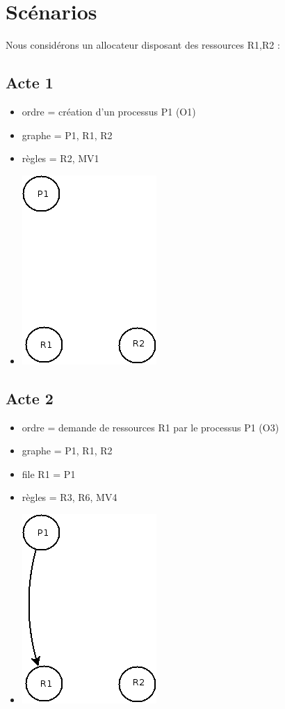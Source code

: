 \documentclass{article}
\newcommand{\bitem}{\item[\textbullet]}
\begin{document}
\newpage
\section{Scénarios}
Nous considérons un allocateur disposant des ressources R1,R2 :\\
\subsection{Acte 1}
\begin{itemize}
  \bitem ordre = création d'un processus P1 (O1)
  \bitem graphe = P1, R1, R2
  \bitem règles = R2, MV1
  \bitem \includegraphics[scale=0.5]{images/acte1}
\end{itemize}
\subsection{Acte 2}
\begin{itemize}
  \bitem ordre = demande de ressources R1 par le processus P1 (O3)
  \bitem graphe = P1, R1, R2
  \bitem file R1 = P1
  \bitem règles = R3, R6, MV4 
  \bitem \includegraphics[scale=0.5]{images/acte2}
\end{itemize}
\end{document}

